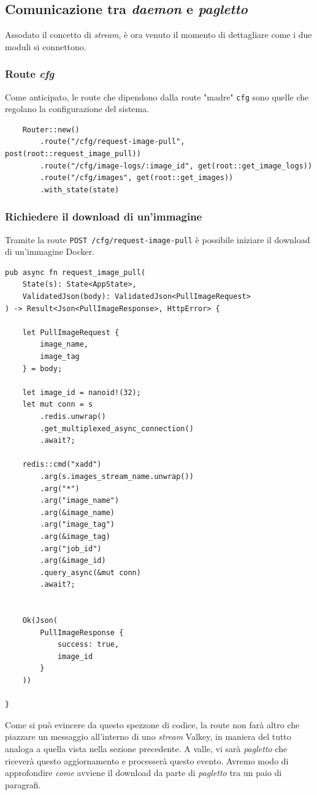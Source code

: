 \subsection{Comunicazione tra \textit{daemon} e \textit{pagletto}}
Assodato il concetto di \textit{stream}, è ora venuto il momento di dettagliare come i due moduli si connettono.
\subsubsection{Route \textit{cfg}}
Come anticipato, le route che dipendono dalla route "madre" \verb|cfg| sono quelle che regolano la configurazione del sistema.
\begin{verbatim}
    Router::new()
        .route("/cfg/request-image-pull", post(root::request_image_pull))
        .route("/cfg/image-logs/:image_id", get(root::get_image_logs))
        .route("/cfg/images", get(root::get_images))
        .with_state(state)
\end{verbatim}

\subsubsection{Richiedere il download di un'immagine}
Tramite la route \verb|POST /cfg/request-image-pull| è possibile iniziare il download di un'immagine Docker.
\begin{verbatim}
pub async fn request_image_pull(
    State(s): State<AppState>,
    ValidatedJson(body): ValidatedJson<PullImageRequest>
) -> Result<Json<PullImageResponse>, HttpError> {

    let PullImageRequest {
        image_name,
        image_tag
    } = body;

    let image_id = nanoid!(32);
    let mut conn = s
        .redis.unwrap()
        .get_multiplexed_async_connection()
        .await?;
        
    redis::cmd("xadd")
        .arg(s.images_stream_name.unwrap())
        .arg("*")
        .arg("image_name")
        .arg(&image_name)
        .arg("image_tag")
        .arg(&image_tag)
        .arg("job_id")
        .arg(&image_id)
        .query_async(&mut conn)
        .await?;


    Ok(Json(
        PullImageResponse {
            success: true,
            image_id
        }
    ))

}

\end{verbatim}
Come si può evincere da questo spezzone di codice, la route non farà altro che piazzare un messaggio all'interno di uno \textit{stream} Valkey, in maniera del tutto analoga a quella vista nella sezione precedente. A valle, vi sarà \textit{pagletto} che riceverà questo aggiornamento e processerà questo evento. Avremo modo di approfondire \textit{come} avviene il download da parte di \textit{pagletto} tra un paio di paragrafi.

